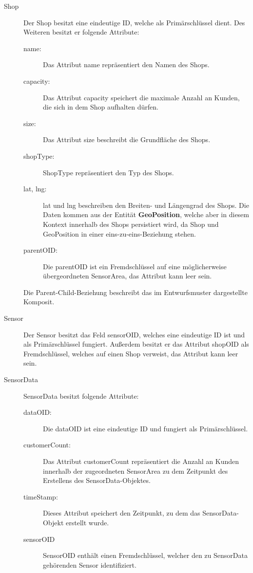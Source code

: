 \documentclass[runningheads]{llncs}
\begin{document}
\begin{description}
	\item[Shop] Der Shop besitzt eine eindeutige ID, welche als Primärschlüssel dient. 
	Des Weiteren besitzt er folgende Attribute: 
	\begin{description}
		\item [name:] Das Attribut name repräsentiert den Namen des Shops.
		\item [capacity:] Das Attribut capacity speichert die maximale Anzahl an Kunden, die sich in dem Shop aufhalten dürfen.
		\item [size:] Das Attribut size beschreibt die Grundfläche des Shops.
		\item [shopType:] ShopType repräsentiert den Typ des Shops.
		\item [lat, lng:] lat und lng beschreiben den Breiten- und Längengrad des Shops. Die Daten kommen aus der Entität \textbf{GeoPosition}, welche aber in diesem Kontext innerhalb des Shops persistiert wird, da Shop und GeoPosition in einer eins-zu-eins-Beziehung stehen.
		\item [parentOID:] Die parentOID ist ein Fremdschlüssel auf eine möglicherweise übergeordneten SensorArea, das Attribut kann leer sein.
	\end{description} 
	Die Parent-Child-Beziehung beschreibt das im Entwurfsmuster dargestellte Komposit.
	\item[Sensor] Der Sensor besitzt das Feld sensorOID, welches eine eindeutige ID ist und als Primärschlüssel fungiert. Außerdem besitzt er das Attribut shopOID als Fremdschlüssel, welches auf einen Shop verweist, das Attribut kann leer sein.
	\item[SensorData] SensorData besitzt folgende Attribute:
	\begin{description}
		\item[dataOID:] Die dataOID ist eine eindeutige ID und fungiert als Primärschlüssel.
		\item[customerCount:] Das Attribut customerCount repräsentiert die Anzahl an Kunden innerhalb der zugeordneten SensorArea zu dem Zeitpunkt des Erstellens des SensorData-Objektes.
		\item[timeStamp:] Dieses Attribut speichert den Zeitpunkt, zu dem das SensorData-Objekt erstellt wurde.
		\item[sensorOID] SensorOID enthält einen Fremdschlüssel, welcher den zu SensorData gehörenden Sensor identifiziert.
	\end{description}
\end{description}
\end{document}
